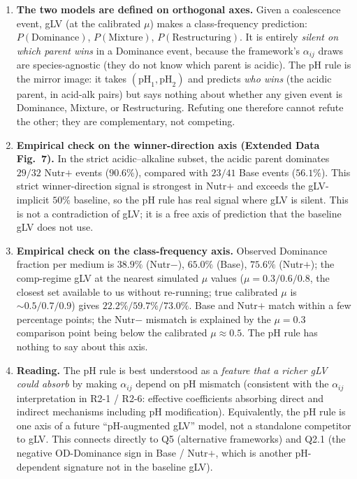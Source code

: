 \documentclass[11pt]{article}
\begin{document}
\begin{enumerate}[itemsep=2pt]
    \item \textbf{The two models are defined on orthogonal axes.} Given a coalescence event, gLV (at the calibrated $\mu$) makes a class-frequency prediction: $P(\text{Dominance})$, $P(\text{Mixture})$, $P(\text{Restructuring})$. It is entirely \emph{silent on which parent wins} in a Dominance event, because the framework's $\alpha_{ij}$ draws are species-agnostic (they do not know which parent is acidic). The pH rule is the mirror image: it takes $(\mathrm{pH}_1, \mathrm{pH}_2)$ and predicts \emph{who wins} (the acidic parent, in acid-alk pairs) but says nothing about whether any given event is Dominance, Mixture, or Restructuring. Refuting one therefore cannot refute the other; they are complementary, not competing.

    \item \textbf{Empirical check on the winner-direction axis (Extended Data Fig.~7).} In the strict acidic--alkaline subset, the acidic parent dominates $29/32$ Nutr$+$ events ($90.6\%$), compared with $23/41$ Base events ($56.1\%$). This strict winner-direction signal is strongest in Nutr$+$ and exceeds the gLV-implicit $50\%$ baseline, so the pH rule has real signal where gLV is silent. This is not a contradiction of gLV; it is a free axis of prediction that the baseline gLV does not use.

    \item \textbf{Empirical check on the class-frequency axis.} Observed Dominance fraction per medium is $38.9\%$ (Nutr$-$), $65.0\%$ (Base), $75.6\%$ (Nutr$+$); the comp-regime gLV at the nearest simulated $\mu$ values ($\mu = 0.3 / 0.6 / 0.8$, the closest set available to us without re-running; true calibrated $\mu$ is $\sim 0.5/0.7/0.9$) gives $22.2\% / 59.7\% / 73.0\%$. Base and Nutr$+$ match within a few percentage points; the Nutr$-$ mismatch is explained by the $\mu = 0.3$ comparison point being below the calibrated $\mu \approx 0.5$. The pH rule has nothing to say about this axis.

    \item \textbf{Reading.} The pH rule is best understood as a \emph{feature that a richer gLV could absorb} by making $\alpha_{ij}$ depend on pH mismatch (consistent with the $\alpha_{ij}$ interpretation in R2-1 / R2-6: effective coefficients absorbing direct and indirect mechanisms including pH modification). Equivalently, the pH rule is one axis of a future ``pH-augmented gLV'' model, not a standalone competitor to gLV. This connects directly to Q5 (alternative frameworks) and Q2.1 (the negative OD-Dominance sign in Base / Nutr$+$, which is another pH-dependent signature not in the baseline gLV).


\end{enumerate}
\end{document}

